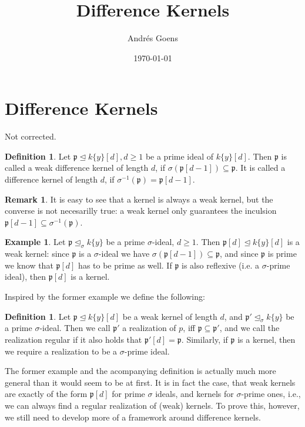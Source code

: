 \documentclass{article}
\title{Difference Kernels}
\author{Andr\'{e}s Goens}
\date{\today}
\def\p{\mathfrak{p}}
\def\s{\sigma}
\def\si{\unlhd_{\sigma}}
\theoremstyle{definition}
\newtheorem{theorem}[Satz]{Theorem}
\newtheorem{ex}[Satz]{Example}
\newtheorem{rem}[Satz]{Remark}
\newtheorem{defn}[Satz]{Definition}
\begin{document}
\section{Difference Kernels}

Not corrected.


\begin{defn}
Let $\p \unlhd k\{y\}[d], d \geq 1$ be a prime ideal of $k\{y\}[d]$. Then $\p$ is called a weak difference kernel of length $d$, if $\s(\p[d-1]) \subseteq \p$. It is called a difference kernel of length $d$, if $\s^{-1}(\p) = \p[d-1]$.
\end{defn}

\begin{rem}
It is easy to see that a kernel is always a weak kernel, but the converse is not necesarilly true: a weak kernel only guarantees the inculsion $\p[d-1] \subseteq \s^{-1}(\p)$.
\end{rem}

\begin{ex}
Let $\p \si k\{y\}$ be a prime $\s$-ideal, $d \geq 1$. Then $\p[d] \unlhd k\{y\}[d]$ is a weak kernel: since $\p$ is a $\s$-ideal we have $\s(\p[d-1]) \subseteq \p$, 
and since $\p$ is prime we know that $\p[d]$ has to be prime as well. If $\p$ is also reflexive (i.e. a $\s$-prime ideal), then $\p[d]$ is a kernel. 
\end{ex}

Inspired by the former example we define the following:
\begin{defn}
Let $\p \unlhd k\{y\}[d]$ be a weak kernel of length $d$, and $\p' \si k\{y\}$ be a prime $\s$-ideal. Then we call $\p'$ a realization of $p$, iff $\p \subseteq \p'$, 
and we call the realization regular if it also holds that $\p'[d] = \p$. Similarly, if $\p$ is a kernel, then we require a realization to be a $\s$-prime ideal.
\end{defn}

The former example and the acompanying definition is actually much more general than it would seem to be at first. 
It is in fact the case, that weak kernels are exactly of the form $\p[d]$ for prime $\s$ ideals,
and kernels for $\s$-prime ones, i.e., we can always find a regular realization of (weak) kernels. 
To prove this, however, we still need to develop more of a framework around difference kernels.
\end{document}
